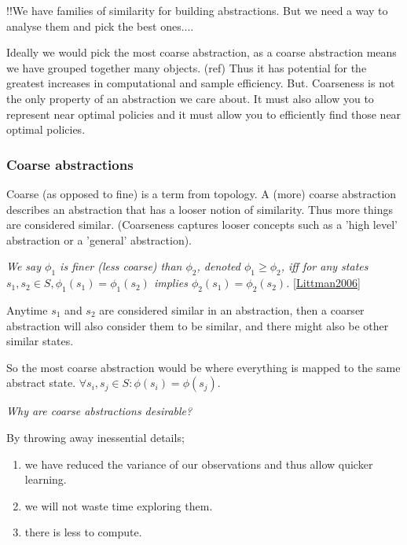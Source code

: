 !!We have families of similarity for building abstractions. But we need a way to analyse them and pick the best ones....

Ideally we would pick the most coarse abstraction, as a coarse abstraction means we have grouped together many objects. (ref)
Thus it has potential for the greatest increases in computational and sample efficiency.
But. Coarseness is not the only property of an abstraction we care about.
It must also allow you to represent near optimal policies and it must allow you
to efficiently find those near optimal policies.


\subsubsection{Coarse abstractions}


Coarse (as opposed to fine) is a term from topology.
A (more) coarse abstraction describes an abstraction that has a looser notion of similarity.
Thus more things are considered similar.
(Coarseness captures looser concepts such as a 'high level' abstraction or a 'general' abstraction).

\textit{We say $\phi_1$ is finer (less coarse) than $\phi_2$, denoted $\phi_1 \ge \phi_2$,
iff for any states $s_1, s_2 \in S, \phi_1(s_1) = \phi_1(s_2)$ implies $\phi_2(s_1) = \phi_2(s_2)$.} \ref{Littman2006}

Anytime $s_1$ and $s_2$ are considered similar in an abstraction, then a coarser
abstraction will also consider them to be similar, and there might also be other similar states.

So the most coarse abstraction would be where everything is mapped to the same abstract state.
$\forall s_i, s_j\in S: \phi(s_i)=\phi(s_j)$.


\begin{displayquote}
\textit{Why are coarse abstractions desirable?}
\end{displayquote}

By throwing away inessential details;
\begin{enumerate}
  \tightlist
  \item we have reduced the variance of our observations and thus allow quicker learning.
  \item we will not waste time exploring them.
  \item there is less to compute.
\end{enumerate}


